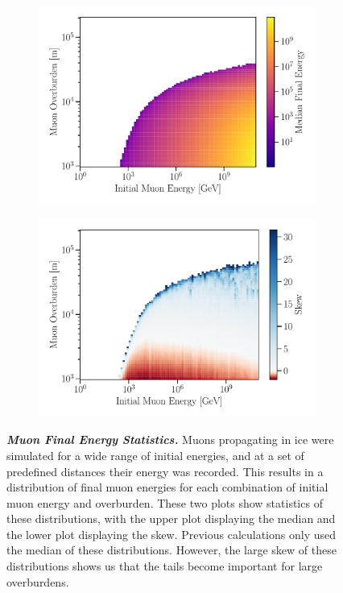 \begin{figure}
	\centering
    \begin{subfigure}{\linewidth}
		\centering
		\includegraphics[width=0.8\linewidth]{figures/preach_median}
	\end{subfigure}
	\begin{subfigure}{\linewidth}
		\centering
		\includegraphics[width=0.8\linewidth]{figures/preach_skew}
	\end{subfigure}
	\caption{\textbf{\textit{Muon Final Energy Statistics.}} Muons propagating in ice were simulated for a wide range of initial energies, and at a set of predefined distances their energy was recorded.
	This results in a distribution of final muon energies for each combination of initial muon energy and overburden.
	These two plots show statistics of these distributions, with the upper plot displaying the median and the lower plot displaying the skew.
	Previous calculations only used the median of these distributions.
	However, the large skew of these distributions shows us that the tails become important for large overburdens.
	}
	\label{fig:preach_stats}
\end{figure}

